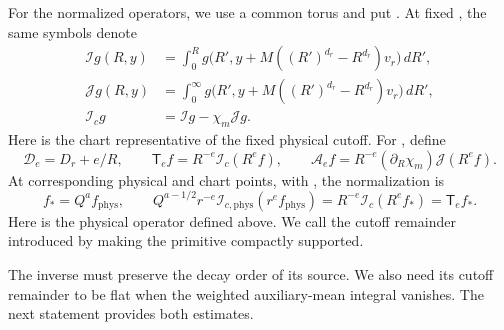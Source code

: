For the normalized operators, we use a common torus
 and put
. At
fixed , the same symbols denote
\begin{equation}
\begin{aligned}
  \mathcal I g(R,y)
    &=\int_0^R g\bigl(R',y+M((R')^{d_r}-R^{d_r})v_r\bigr)\,dR',\\
  \mathcal J g(R,y)
    &=\int_0^\infty g\bigl(R',y+M((R')^{d_r}-R^{d_r})v_r\bigr)\,dR',\\
  \mathcal I_c g&=\mathcal I g-\chi_m\mathcal J g.
\end{aligned}
\tag{8.5}\label{eq:8.5}
\end{equation}
Here  is the chart representative of the fixed physical cutoff. For
, define
\begin{equation}
  \mathcal D_e=D_r+e/R,
  \qquad \mathsf T_e f=R^{-e}\mathcal I_c(R^e f),
  \qquad \mathcal A_e f=R^{-e}(\partial_R\chi_m)\mathcal J(R^e f).
\tag{8.6}\label{eq:8.6}
\end{equation}
At corresponding physical and chart points, with
, the normalization is
\[
  f_*=Q^a f_{\mathrm{phys}},
  \qquad
  Q^{a-1/2}r^{-e}\mathcal I_{c,\mathrm{phys}}(r^e f_{\mathrm{phys}})
   =R^{-e}\mathcal I_c(R^e f_*)=\mathsf T_e f_*.
\]
Here  is the physical operator defined above. We call
 the cutoff remainder
introduced by making the primitive compactly supported.

The inverse must preserve the decay order of its source. We also need its cutoff remainder
to be flat when the weighted auxiliary-mean integral vanishes. The next statement provides
both estimates.

